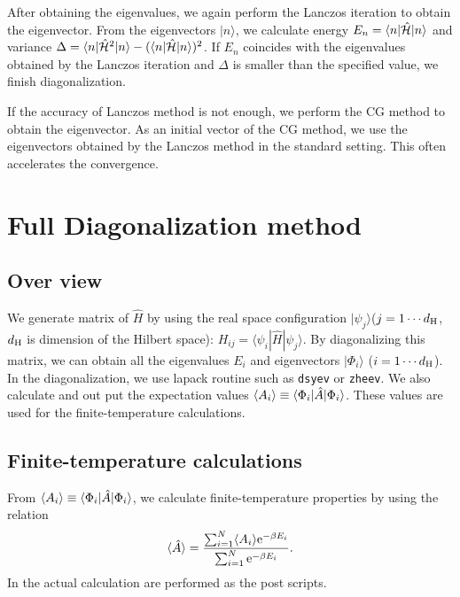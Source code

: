After obtaining the eigenvalues,
we again perform the Lanczos iteration
to obtain the eigenvector.
From the eigenvectors $|n\rangle$,
we calculate 
energy $E_{n}=\langle n|\hat{\mathcal{H}}|n\rangle $ and
variance $\Delta=\langle n|\hat{\mathcal{H}}^{2}|n\rangle -(\langle n|\hat{\mathcal{H}}|n\rangle)^2$.
If $E_{n}$ coincides with the eigenvalues obtained by the Lanczos iteration and 
$\Delta$ is smaller than the specified value,
we finish diagonalization.

If the accuracy of Lanczos method is not enough,
we perform the CG method to obtain the eigenvector.
As an initial vector of the CG method,
we use the eigenvectors obtained by the Lanczos method in the standard setting.
This often accelerates the convergence.
\section{Full Diagonalization method}
\label{Ch:AllDiagonalization}
\subsection{Over view}
We generate matrix of ${\hat{H}}$ by using the real space configuration 
$| \psi_j \rangle$($j=1\cdots d_{\rm H}$, $d_{\rm H}$ is dimension of the Hilbert space): 
$H_{ij}= \langle \psi_i | {\hat H} | \psi_j \rangle$.
By diagonalizing this matrix,
we can obtain all the eigenvalues $E_{i}$ and eigenvectors $|\Phi_i\rangle$ ($i=1 \cdots d_{\rm H}$). 
In the diagonalization, we use lapack routine such as \verb|dsyev| or \verb|zheev|.
We also calculate and out put
the expectation values $\langle A_i\rangle \equiv \langle \Phi_i | {\hat A} | \Phi_i\rangle$.
These values are used for the finite-temperature calculations.

\subsection{Finite-temperature calculations}
From
$\langle A_i\rangle \equiv \langle \Phi_i | {\hat A} | \Phi_i\rangle$,
we calculate finite-temperature properties by using the relation 
\begin{equation}
\langle {\hat A}\rangle=\frac{\sum_{i=1}^N \langle A_i\rangle {\rm  e}^{-\beta E_i}}{\sum_{i=1}^N{\rm  e}^{-\beta E_i}}.
\end{equation}
In the actual calculation are performed as the post scripts.

